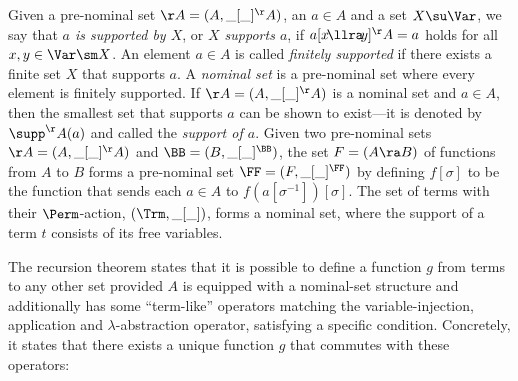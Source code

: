 Given a pre-nominal set $\AA = (A,\_[\_]^\AA)$, an %
$a\in A$ and a set $X\su\Var$, we say that \emph{$a$ is supported by $X$}, or  
\emph{$X$ supports $a$}, if 
$a [x \!\llra\! y]^\AA = a$ holds for all $x,y\in\Var \sm X$. 
%
An element $a\in A$ is called \emph{finitely supported} if there exists a finite set $X$ that supports $a$. 
%
A \emph{nominal set} is a pre-nominal set %
where every element is finitely supported.
%
If $\AA = (A,\_[\_]^\AA)$ is a nominal set and $a\in A$, then the smallest set  
that supports $a$ can be shown to exist---it is denoted by $\supp^\AA(a)$ and called the \emph{support of $a$}.  %
%
Given two pre-nominal sets $\AA = (A,\_[\_]^\AA)$ and $\BB = (B,\_[\_]^\BB)$,  the set $F = (A \ra B)$ of functions from $A$ to $B$ %
forms a pre-nominal set   $\FF = (F,\_[\_]^\FF)$ by defining $f[\sigma]$ to be the function that sends each $a\in A$ to $f(a[\sigma^{-1}])[\sigma]$.  %
%
The set of terms %
with their $\Perm$-action, $(\Trm,\_[\_])$, forms a nominal set, where the support of a term $t$ consists %
of its free variables.

The %
recursion theorem states that it is possible to define a function $g$ from terms to any other set provided $A$ is equipped with a nominal-set structure and additionally has some ``term-like'' operators matching the variable-injection, application and $\lambda$-abstraction operator, satisfying a specific condition. Concretely, %
it states that there exists a unique function $g$ that commutes with these operators: %

